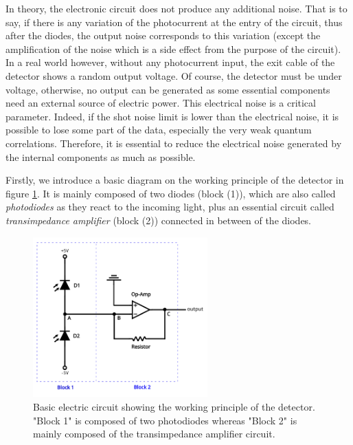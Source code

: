 \documentclass[11pt]{report}
\begin{document}
In theory, the electronic circuit does not produce any additional noise. That is to say, if there is any variation of the photocurrent at the entry of the circuit, thus after the diodes, the output noise corresponds to this variation (except the amplification of the noise which is a side effect from the purpose of the circuit). In a real world however, without any photocurrent input, the exit cable of the detector shows a random output voltage. Of course, the detector must be under voltage, otherwise, no output can be generated as some essential components need an external source of electric power. This electrical noise is a critical parameter. Indeed, if the shot noise limit is lower than the electrical noise, it is possible to lose some part of the data, especially the very weak quantum correlations. Therefore, it is essential to reduce the electrical noise generated by the internal components as much as possible.

Firstly, we introduce a basic diagram on the working principle of the detector in figure \ref{fig:detector-fst}. It is mainly composed of two diodes (block (1)), which are also called \textit{photodiodes} as they react to the incoming light, plus an essential circuit called \textit{transimpedance amplifier} (block (2)) connected in between of the diodes.

\begin{figure}[h!]
\centering
\includegraphics[width=0.6\textwidth]{detector-fst}
\caption{Basic electric circuit showing the working principle of the detector. "Block 1" is composed of two photodiodes whereas "Block 2" is mainly composed of the transimpedance amplifier circuit.}
\label{fig:detector-fst}
\end{figure}
\end{document}
